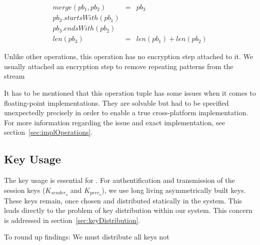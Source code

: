 \begin{eqnarray}
merge(pb_1, pb_2) & = & pb_3 \\
pb_3.startsWith(pb_1)\\
pb_3.endsWith(pb_2)\\
len(pb_3) & = & len(pb_1) + len(pb_2)
\end{eqnarray}

Unlike other operations, this operation has no encryption step attached to it. We usually attached an encryption step to remove repeating patterns from the \VortexMessage stream

It has to be mentioned that this operation tuple has some issues when it comes to floating-point implementations. They are solvable but had to be specified unexpectedly precisely in order to enable a true cross-platform implementation. For more information regarding the issue and exact implementation, see section~\ref{sec:implOperations}.

\subsection{Key Usage\label{sec:keyUsage}}
The key usage is essential for \MessageVortex. For authentification and transmission of the session keys ($K_{sender_o}$ and $K_{peer_o}$), we use long living asymmetrically built keys. These keys remain, once chosen and distributed statically in the system. This leads directly to the problem of key distribution within our system. This concern is addressed in section~\ref{sec:keyDistribution}.

To round up findings: We must distribute all keys not 


%
%
%
%
%

